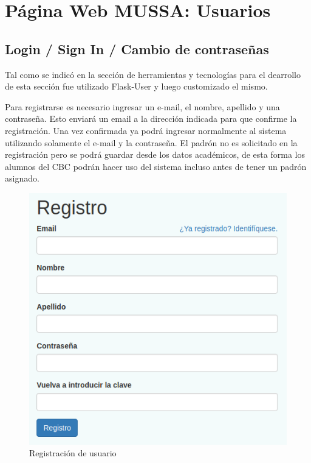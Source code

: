 \documentclass[a4paper]{article}
\begin{document}
\newpage
\section{Página Web MUSSA: Usuarios}

\subsection{Login / Sign In / Cambio de contraseñas}

Tal como se indicó en la sección de herramientas y tecnologías para el dearrollo de esta sección fue utilizado Flask-User y luego customizado el mismo.

Para registrarse es necesario ingresar un e-mail, el nombre, apellido y una contraseña. Esto enviará un email a la dirección indicada para que confirme la registración. Una vez confirmada ya podrá ingresar normalmente al sistema utilizando solamente el e-mail y la contraseña. El padrón no es solicitado en la registración pero se podrá guardar desde los datos académicos, de esta forma los alumnos del CBC podrán hacer uso del sistema incluso antes de tener un padrón asignado.

\begin{figure}[H]
\centering
\includegraphics[scale=0.4]{Imagenes/registracion.png}\par
\caption{Registración de usuario}
\end{figure}
\end{document}

